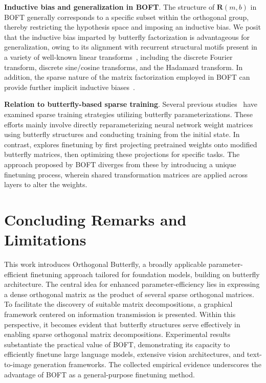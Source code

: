 \textbf{Inductive bias and generalization in BOFT}. The structure of $\bm{R}(m,b)$ in BOFT generally corresponds to a specific subset within the orthogonal group, thereby restricting the hypothesis space and imposing an inductive bias. We posit that the inductive bias imparted by butterfly factorization is advantageous for generalization, owing to its alignment with recurrent structural motifs present in a variety of well-known linear transforms~\cite{dao2019kaleidoscope}, including the discrete Fourier transform, discrete sine/cosine transforms, and the Hadamard transform. In addition, the sparse nature of the matrix factorization employed in BOFT can provide further implicit inductive biases~\cite{gunasekar2017implicit,li2018algorithmic,liu2019neural}.

\textbf{Relation to butterfly-based sparse training}. Several previous studies~\cite{dao2019learning,dao2019kaleidoscope,chen2022pixelated,dao2022monarch} have examined sparse training strategies utilizing butterfly parameterizations. These efforts mainly involve directly reparameterizing neural network weight matrices using butterfly structures and conducting training from the initial state. In contrast, \cite{dao2022monarch} explores finetuning by first projecting pretrained weights onto modified butterfly matrices, then optimizing these projections for specific tasks. The approach proposed by BOFT diverges from these by introducing a unique finetuning process, wherein shared transformation matrices are applied across layers to alter the weights.



\section{Concluding Remarks and Limitations}

This work introduces Orthogonal Butterfly, a broadly applicable parameter-efficient finetuning approach tailored for foundation models, building on butterfly architecture. The central idea for enhanced parameter-efficiency lies in expressing a dense orthogonal matrix as the product of several sparse orthogonal matrices. To facilitate the discovery of suitable matrix decompositions, a graphical framework centered on information transmission is presented. Within this perspective, it becomes evident that butterfly structures serve effectively in enabling sparse orthogonal matrix decompositions. Experimental results substantiate the practical value of BOFT, demonstrating its capacity to efficiently finetune large language models, extensive vision architectures, and text-to-image generation frameworks. The collected empirical evidence underscores the advantage of BOFT as a general-purpose finetuning method.

